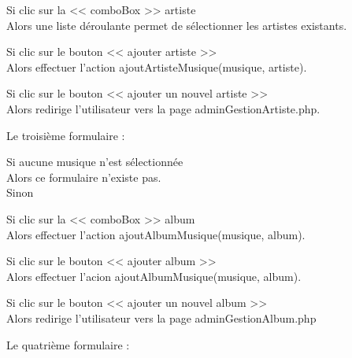			\begin{paragraphe}
				Si clic sur la << comboBox >> artiste \\
				Alors une liste déroulante permet de sélectionner les artistes existants.
			\end{paragraphe}

			\begin{paragraphe}
				Si clic sur le bouton << ajouter artiste >> \\
				Alors effectuer l'action ajoutArtisteMusique(musique, artiste).
			\end{paragraphe}

			\begin{paragraphe}
				Si clic sur le bouton << ajouter un nouvel artiste >> \\
				Alors redirige l'utilisateur vers la page adminGestionArtiste.php.
			\end{paragraphe}

			\begin{paragraphe}
				Le troisième formulaire :
			\end{paragraphe}

			\begin{paragraphe}
				Si aucune musique n'est sélectionnée \\
				Alors ce formulaire n'existe pas. \\
				Sinon
			\end{paragraphe}

			\begin{paragraphe}
				Si clic sur la << comboBox >> album \\
				Alors effectuer l'action ajoutAlbumMusique(musique, album).
			\end{paragraphe}

			\begin{paragraphe}
				Si clic sur le bouton << ajouter album >> \\
				Alors effectuer l'acion ajoutAlbumMusique(musique, album).
			\end{paragraphe}

			\begin{paragraphe}
				Si clic sur le bouton << ajouter un nouvel album >> \\
				Alors redirige l'utilisateur vers la page adminGestionAlbum.php
			\end{paragraphe}

			\begin{paragraphe}
				Le quatrième formulaire :
			\end{paragraphe}


